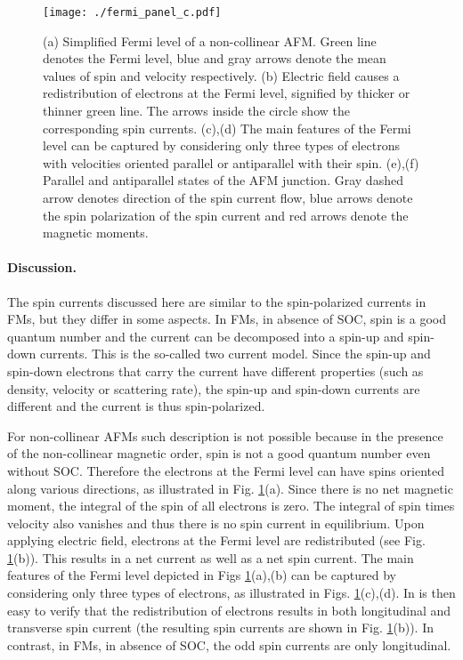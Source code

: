 \documentclass[aps,prl,reprint,amsmath,amssymb,superscriptaddress]{revtex4-1}
\begin{document}
\begin{figure}[h]
  \centering
  \texttt{[image: ./fermi\_panel\_c.pdf]}
  \caption{(a) Simplified Fermi level of a non-collinear AFM. Green line denotes the Fermi level, blue and gray arrows denote the mean values of spin and velocity respectively. (b) Electric field causes a redistribution of electrons at the Fermi level, signified by thicker or thinner green line. The arrows inside the circle show the corresponding spin currents. (c),(d) The main features of the Fermi level can be captured by considering only three types of electrons with velocities oriented parallel or antiparallel with their spin. (e),(f) Parallel and antiparallel states of the AFM junction. Gray dashed arrow denotes direction of the spin current flow, blue arrows denote the spin polarization of the spin current and red arrows denote the magnetic moments.  }
  \label{fig:TMR}
\end{figure}

\paragraph{Discussion.} 
The spin currents discussed here are similar to the spin-polarized currents in FMs, but they differ in some aspects. In FMs, in absence of SOC, spin is a good quantum number and the current can be decomposed into a spin-up and spin-down currents. This is the so-called two current model. Since the spin-up and spin-down electrons that carry the current have different properties (such as density, velocity or scattering rate), the spin-up and spin-down currents are different and the current is thus spin-polarized.

For non-collinear AFMs such description is not possible because in the presence of the non-collinear magnetic order, spin is not a good quantum number even without SOC. Therefore the electrons at the Fermi level can have spins oriented along various directions, as illustrated in Fig. \ref{fig:TMR}(a). Since there is no net magnetic moment, the integral of the spin of all electrons is zero. The integral of spin times velocity also vanishes and thus there is no spin current in equilibrium. Upon applying electric field, electrons at the Fermi level are redistributed (see Fig. \ref{fig:TMR}(b)). This results in a net current as well as a net spin current. The main features of the Fermi level depicted in Figs \ref{fig:TMR}(a),(b) can be captured by considering only three types of electrons, as illustrated in Figs. \ref{fig:TMR}(c),(d).  In is then easy to verify that the redistribution of electrons results in both longitudinal and transverse spin current (the resulting spin currents are shown in Fig. \ref{fig:TMR}(b)). In contrast, in FMs, in absence of SOC, the odd spin currents are only longitudinal. 
\end{document}
